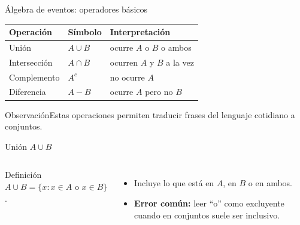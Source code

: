 \documentclass[aspectratio=169,11pt]{beamer}
\newcommand{\errorcomun}[1]{\textbf{Error común:} #1}
\newcommand{\observacion}[1]{\begin{block}{Observación}#1\end{block}}
\begin{document}
\begin{frame}{Álgebra de eventos: operadores básicos}
\small
\begin{tabular}{p{}p{}p{}}
\toprule
Operación & Símbolo & Interpretación \\
\midrule
Unión & $A\cup B$ & ocurre $A$ o $B$ o ambos \\
Intersección & $A\cap B$ & ocurren $A$ y $B$ a la vez \\
Complemento & $A^c$ & no ocurre $A$ \\
Diferencia & $A-B$ & ocurre $A$ pero no $B$ \\
\bottomrule
\end{tabular}
\vspace{0.6em}
\observacion{Estas operaciones permiten traducir frases del lenguaje cotidiano a conjuntos.}
\end{frame}

\begin{frame}{Unión $A\cup B$}
\begin{columns}[T]
\begin{block}{Definición}
$A\cup B=\{x:x\in A \text{ o } x\in B\}$.
\end{block}
\begin{itemize}
  \item Incluye lo que está en $A$, en $B$ o en ambos.
  \item \errorcomun{leer ``o'' como excluyente cuando en conjuntos suele ser inclusivo.}
\end{itemize}
\end{columns}
\end{frame}
\end{document}
